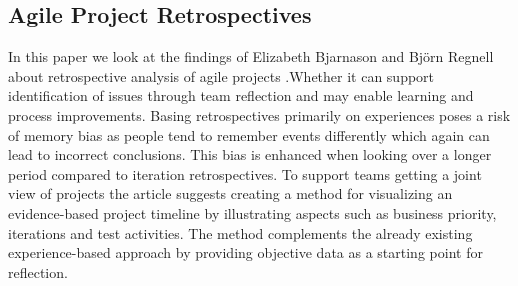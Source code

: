 \subsection{Agile Project Retrospectives}
In this paper we look at the findings of Elizabeth Bjarnason and Björn Regnell about retrospective analysis of agile projects \citep{Bjarnason2012}.Whether it can support identification of issues through team reflection and may enable learning and process improvements. Basing retrospectives primarily on experiences poses a risk of memory bias as people tend to remember events differently which again can lead to incorrect conclusions. This bias is enhanced when looking over a longer period compared to iteration retrospectives. To support teams getting a joint view of projects the article suggests creating a method for visualizing an evidence-based project timeline by illustrating aspects such as business priority, iterations and test activities. The method complements the already existing experience-based approach by providing objective data as a starting point for reflection.